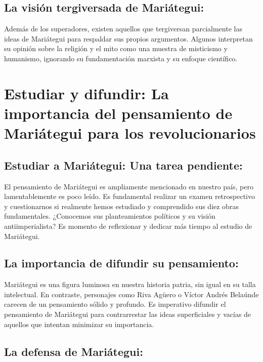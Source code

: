\documentclass[
  jou,
  floatsintext,
  longtable,
  a4paper,
  nolmodern,
  notxfonts,
  notimes,
  12pt,
  colorlinks=true,linkcolor=blue,citecolor=blue,urlcolor=blue]{apa7}
\begin{document}
\subsection{La visión tergiversada de
Mariátegui:}\label{la-visiuxf3n-tergiversada-de-mariuxe1tegui}

Además de los superadores, existen aquellos que tergiversan parcialmente
las ideas de Mariátegui para respaldar sus propios argumentos. Algunos
interpretan su opinión sobre la religión y el mito como una muestra de
misticismo y humanismo, ignorando su fundamentación marxista y su
enfoque científico.

\section{Estudiar y difundir: La importancia del pensamiento de
Mariátegui para los
revolucionarios}\label{estudiar-y-difundir-la-importancia-del-pensamiento-de-mariuxe1tegui-para-los-revolucionarios}

\subsection{Estudiar a Mariátegui: Una tarea
pendiente:}\label{estudiar-a-mariuxe1tegui-una-tarea-pendiente}

El pensamiento de Mariátegui es ampliamente mencionado en nuestro país,
pero lamentablemente es poco leído. Es fundamental realizar un examen
retrospectivo y cuestionarnos si realmente hemos estudiado y comprendido
sus diez obras fundamentales. ¿Conocemos sus planteamientos políticos y
su visión antiimperialista? Es momento de reflexionar y dedicar más
tiempo al estudio de Mariátegui.

\subsection{La importancia de difundir su
pensamiento:}\label{la-importancia-de-difundir-su-pensamiento}

Mariátegui es una figura luminosa en nuestra historia patria, sin igual
en su talla intelectual. En contraste, personajes como Riva Agüero o
Víctor Andrés Belaúnde carecen de un pensamiento sólido y profundo. Es
imperativo difundir el pensamiento de Mariátegui para contrarrestar las
ideas superficiales y vacías de aquellos que intentan minimizar su
importancia.

\subsection{La defensa de
Mariátegui:}\label{la-defensa-de-mariuxe1tegui}
\end{document}
